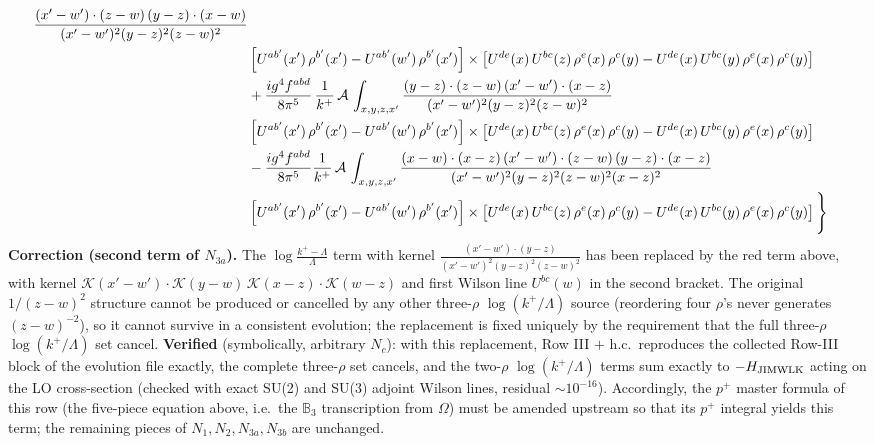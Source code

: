 \documentclass[9pt]{article}
\numberwithin{equation}{section}
\begin{document}
\begin{align}
\frac{(x'-w')\cdot(z-w)\,(y-z)\cdot(x-w)}{(x'-w')^{2}(y-z)^{2}(z-w)^{2}}\notag \\
& \left[U^{ab'}(x')\,\rho^{b'}(x')-U^{ab'}(w')\, \rho^{b'}(x')\right]\times \left[U^{de}(x)\,U^{bc}(z)\, \rho^{e}(x)\,\rho^{c}(y)-U^{de}(x)\,U^{bc}(y)\,\rho^{e}(x)\,\rho^{c}(y)\right]\notag \\ & +\frac{ig^{4}f^{abd}}{8\pi^{5}}\,\frac{1}{k^{+}}\,\mathcal{A}\,\int_{x,y,z,x'}
\frac{(y-z)\cdot(z-w)\,(x'-w')\cdot(x-z)}{(x'-w')^{2}(y-z)^{2}(z-w)^{2}}\notag \\ & \left[U^{ab'}(x')\,\rho^{b'}(x')-U^{ab'}(w')\, \rho^{b'}(x')\right]\times \left[U^{de}(x)\,U^{bc}(z)\, \rho^{e}(x)\,\rho^{c}(y)-U^{de}(x)\,U^{bc}(y)\,\rho^{e}(x)\,\rho^{c}(y)\right]\notag \\ & -\frac{ig^{4}f^{abd}}{8\pi^{5}}\frac{1}{k^{+}}\,\mathcal{A}\,\int_{x,y,z,x'}
\frac{(x-w)\cdot(x-z)\,(x'-w')\cdot(z-w)\,(y-z)\cdot(x-z)}{(x'-w')^{2}(y-z)^{2}(z-w)^{2}(x-z)^{2}}\notag \\ & \left[U^{ab'}(x')\,\rho^{b'}(x')-U^{ab'}(w')\, \rho^{b'}(x')\right]\times \left[U^{de}(x)\,U^{bc}(z)\, \rho^{e}(x)\,\rho^{c}(y)-U^{de}(x)\,U^{bc}(y)\,\rho^{e}(x)\,\rho^{c}(y)\right]\Bigg\}
\end{align}
{\color{red}\noindent\textbf{Correction (second term of $N_{3a}$).} The $\log\frac{k^{+}-\Lambda}{\Lambda}$ term with kernel $\frac{(x'-w')\cdot(y-z)}{(x'-w')^{2}(y-z)^{2}(z-w)^{2}}$ has been replaced by the red term above, with kernel $\mathcal K(x'-w')\!\cdot\!\mathcal K(y-w)\,\mathcal K(x-z)\!\cdot\!\mathcal K(w-z)$ and first Wilson line $U^{bc}(w)$ in the second bracket. The original $1/(z-w)^{2}$ structure cannot be produced or cancelled by any other three-$\rho$ $\log(k^{+}/\Lambda)$ source (reordering four $\rho$'s never generates $(z-w)^{-2}$), so it cannot survive in a consistent evolution; the replacement is fixed uniquely by the requirement that the full three-$\rho$ $\log(k^{+}/\Lambda)$ set cancel. \textbf{Verified} (symbolically, arbitrary $N_{c}$): with this replacement, Row III $+$ h.c.\ reproduces the collected Row-III block of the evolution file exactly, the complete three-$\rho$ set cancels, and the two-$\rho$ $\log(k^{+}/\Lambda)$ terms sum exactly to $-H_{\rm JIMWLK}$ acting on the LO cross-section (checked with exact SU(2) and SU(3) adjoint Wilson lines, residual $\sim10^{-16}$). Accordingly, the $p^{+}$ master formula of this row (the five-piece equation above, i.e.\ the $\mathbb{B}_{3}$ transcription from $\Omega$) must be amended upstream so that its $p^{+}$ integral yields this term; the remaining pieces of $N_{1},N_{2},N_{3a},N_{3b}$ are unchanged.}
\end{document}
